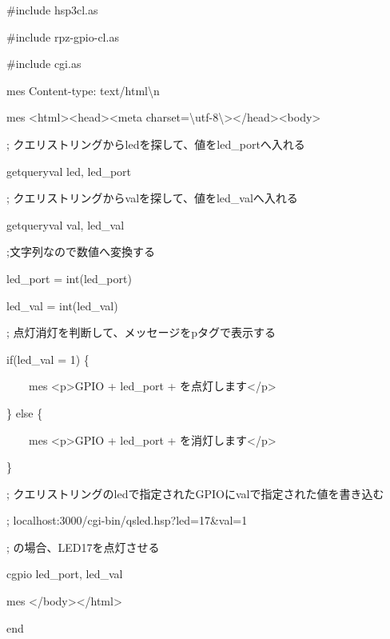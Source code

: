 \documentclass[a4paper,12pt,dvipdfmx]{jarticle}
\begin{document}
\centering
\begin{boxedminipage}{16.538cm}
	\#include {\textquotedbl}hsp3cl.as{\textquotedbl}

	\#include {\textquotedbl}rpz-gpio-cl.as{\textquotedbl}

	\#include {\textquotedbl}cgi.as{\textquotedbl}

	mes {\textquotedbl}Content-type: text/html{\textbackslash}n{\textquotedbl}

	mes {\textquotedbl}{\textless}html{\textgreater}{\textless}head{\textgreater}{\textless}meta
	charset={\textbackslash}{\textquotedbl}utf-8{\textbackslash}{\textquotedbl}{\textgreater}{\textless}/head{\textgreater}{\textless}body{\textgreater}{\textquotedbl}


	\bigskip

	;
	クエリストリングからledを探して、値をled\_portへ入れる

	getqueryval {\textquotedbl}led{\textquotedbl}, led\_port

	;
	クエリストリングからvalを探して、値をled\_valへ入れる

	getqueryval {\textquotedbl}val{\textquotedbl}, led\_val

	;文字列なので数値へ変換する

	led\_port = int(led\_port)

	led\_val = int(led\_val)


	\bigskip

	;
	点灯消灯を判断して、メッセージをpタグで表示する

	if(led\_val = 1) \{

	\ \ \ \ mes {\textquotedbl}{\textless}p{\textgreater}GPIO{\textquotedbl} + led\_port +
	{\textquotedbl}を点灯します{\textless}/p{\textgreater}{\textquotedbl}

	\} else \{

	\ \ \ \ mes {\textquotedbl}{\textless}p{\textgreater}GPIO{\textquotedbl} + led\_port +
	{\textquotedbl}を消灯します{\textless}/p{\textgreater}{\textquotedbl}

	\}


	\bigskip

	;
	クエリストリングのledで指定されたGPIOにvalで指定された値を書き込む

	; localhost:3000/cgi-bin/qsled.hsp?led=17\&val=1

	; の場合、LED17を点灯させる

	cgpio led\_port, led\_val

	mes {\textquotedbl}{\textless}/body{\textgreater}{\textless}/html{\textgreater}{\textquotedbl}

	end
\end{boxedminipage}
\flushleft
\end{document}
